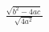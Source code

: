 \documentclass[preview]{standalone}
\begin{document}
\begin{align*}
\frac{\sqrt{{b}^{2} - 4 a c}}{\sqrt{4 {a}^{2}}}
\end{align*}
\end{document}
